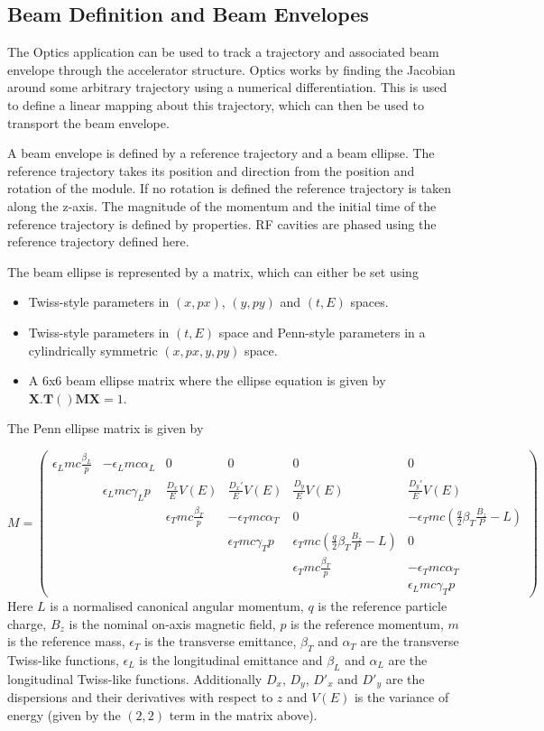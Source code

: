 \subsection{Beam Definition and Beam Envelopes}
The Optics application can be used to track a trajectory and associated beam envelope through the accelerator structure.
Optics works by finding the Jacobian around some arbitrary trajectory using a numerical differentiation. This is used
to define a linear mapping about this trajectory, which can then be used to transport the beam envelope.

A beam envelope is defined by a reference trajectory and a beam ellipse. The reference trajectory takes its position and
direction from the position and rotation of the module. If no rotation is defined the reference trajectory is taken along
the z-axis. The magnitude of the momentum and the initial time of the reference trajectory is defined by properties. RF
cavities are phased using the reference trajectory defined here.

The beam ellipse is represented by a matrix, which can either be set using 

\begin{itemize}
\item Twiss-style parameters in $(x,px)$, $(y,py)$ and $(t,E)$ spaces.
\item Twiss-style parameters in $(t,E)$ space and Penn-style parameters in a cylindrically symmetric $(x,px,y,py)$ space.
\item A 6x6 beam ellipse matrix where the ellipse equation is given by $\mathbf{X}.\mathbf{T}() \mathbf{M} \mathbf{X} =
1$.
\end{itemize}
The Penn ellipse matrix is given by

\begin{equation*}
M=\left(\begin{matrix}\epsilon_Lmc\frac{\beta_L}{p}&-\epsilon_Lmc\alpha _L&0&0&0&0\\
       &\epsilon_Lmc\gamma_Lp&\frac{D_x}{E}V(E)&\frac{D_x'}{E}V(E)&\frac{D_y}{E}V(E)&\frac{D_y'}{E}V(E)\\
       &&\epsilon _Tmc\frac{\beta _T}{p}&-\epsilon_Tmc\alpha_T&0&-\epsilon _Tmc(\frac{q}{2}\beta _T\frac{B_z}{P}-L)\\
      &&&\epsilon _Tmc\gamma _Tp&\epsilon _Tmc(\frac{q}{
2}\beta _T\frac{B_z}{P}-L)&0\\&&&&\epsilon _Tmc\frac{\beta _T}{p}&-\epsilon _Tmc\alpha _T\\&&&&&\epsilon _Lmc\gamma
_Tp\end{matrix}\right)
\end{equation*}
Here $L$ is a normalised canonical angular momentum, $q$ is the reference particle charge,
$B_{z}$ is the nominal on-axis magnetic field, $p$ is the reference momentum,
$m$ is the reference mass, $\epsilon_T$ is the transverse emittance, $\beta_T$ and
$\alpha_{T}$ are the transverse Twiss-like functions, $\epsilon_{L}$ is the longitudinal emittance and
$\beta_{L}$ and $\alpha_{L}$ are the longitudinal Twiss-like functions. Additionally $D_{x}$,
$D_{y}$, $D'_{x}$ and $D'_{y}$ are the dispersions and their derivatives with respect to
$z$ and $V(E)$ is the variance of energy (given by the $(2,2)$ term in the matrix above).

